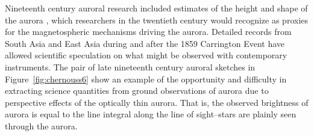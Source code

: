 Nineteenth century auroral research included estimates of the height and shape of the aurora \citep{omholtbook}, which researchers in the twentieth century would recognize as proxies for the magnetospheric mechanisms driving the aurora.
Detailed records from South Asia and East Asia during and after the 1859 Carrington Event \citep{hayakawa2016east,keika2015caused} have allowed scientific speculation on what might be observed with contemporary instruments.
The pair of late nineteenth century auroral sketches in Figure~\ref{fig:chernouss6} \citep{chernouss2005} show an example of the opportunity and difficulty in extracting science quantities from ground observations of aurora due to perspective effects of the optically thin aurora.
That is, the observed brightness of aurora is equal to the line integral along the line of sight--stars are plainly seen through the aurora.
